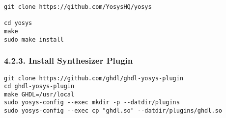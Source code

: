 \documentclass[]{article}
\begin{document}
\begin{verbatim}
git clone https://github.com/YosysHQ/yosys

cd yosys
make
sudo make install
\end{verbatim}

\subsubsection{4.2.3. Install Synthesizer
Plugin}\label{install-synthesizer-plugin}

\begin{verbatim}
git clone https://github.com/ghdl/ghdl-yosys-plugin
cd ghdl-yosys-plugin
make GHDL=/usr/local
sudo yosys-config --exec mkdir -p --datdir/plugins
sudo yosys-config --exec cp "ghdl.so" --datdir/plugins/ghdl.so
\end{verbatim}
\end{document}
